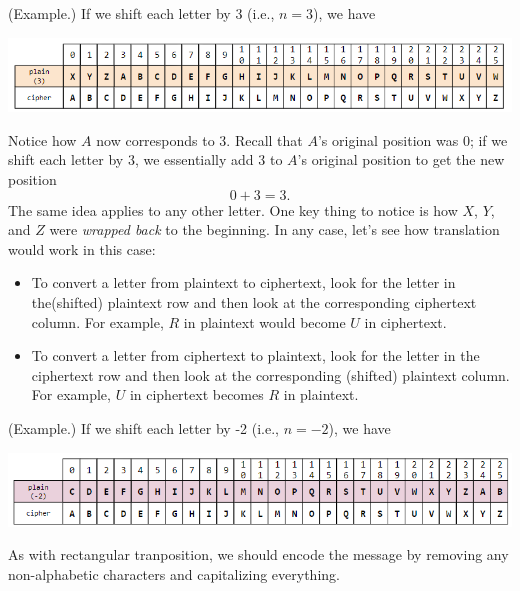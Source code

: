 \documentclass[letterpaper]{article}
\begin{document}
\begin{mdframed}
    (Example.) If we shift each letter by 3 (i.e., $n = 3$), we have 
    \begin{center}
        \includegraphics[scale=0.7]{../assets/ceasar_2.png}
    \end{center}
    Notice how $A$ now corresponds to 3. Recall that $A$'s original position was 0; if we shift each letter by 3, we essentially add 3 to $A$'s original position to get the new position 
    \[0 + 3 = 3.\]
    The same idea applies to any other letter. One key thing to notice is how $X$, $Y$, and $Z$ were \emph{wrapped back} to the beginning. In any case, let's see how translation would work in this case: 
    \begin{itemize}
        \item To convert a letter from plaintext to ciphertext, look for the letter in the(shifted) plaintext row and then look at the corresponding ciphertext column. For example, $R$ in plaintext would become $U$ in ciphertext. 
        \item To convert a letter from ciphertext to plaintext, look for the letter in the ciphertext row and then look at the corresponding (shifted) plaintext column. For example, $U$ in ciphertext becomes $R$ in plaintext. 
    \end{itemize}
\end{mdframed}

\begin{mdframed}
    (Example.) If we shift each letter by -2 (i.e., $n = -2$), we have 
    \begin{center}
        \includegraphics[scale=0.7]{../assets/ceasar_3.png}
    \end{center}
\end{mdframed}

As with rectangular tranposition, we should encode the message by removing any non-alphabetic characters and capitalizing everything. 
\end{document}
